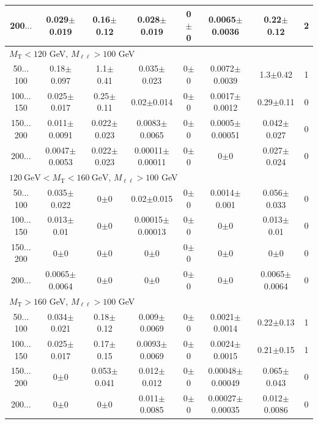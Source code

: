\begin{landscape}
\begin{table}
\begin{center}
\begin{tabular}{| c | c c c c c c c | }
200$\dots$&0.029$\pm$0.019&0.16$\pm$0.12&0.028$\pm$0.019&0$\pm$0&0.0065$\pm$0.0036&0.22$\pm$0.12&2\\
\hline\hline
\multicolumn{8}{l}{$M_{\text{T}} < 120$ GeV, $M_{\ell\ell} > 100$ GeV}\\\hline\hline
50$\dots$100&0.18$\pm$0.097&1.1$\pm$0.41&0.035$\pm$0.023&0$\pm$0&0.0072$\pm$0.0039&1.3$\pm$0.42&1\\
100$\dots$150&0.025$\pm$0.017&0.25$\pm$0.11&0.02$\pm$0.014&0$\pm$0&0.0017$\pm$0.0012&0.29$\pm$0.11&0\\
150$\dots$200&0.011$\pm$0.0091&0.022$\pm$0.023&0.0083$\pm$0.0065&0$\pm$0&0.0005$\pm$0.00051&0.042$\pm$0.027&0\\
200$\dots$&0.0047$\pm$0.0053&0.022$\pm$0.023&0.00011$\pm$0.00011&0$\pm$0&0$\pm$0&0.027$\pm$0.024&0\\
\hline\hline
\multicolumn{8}{l}{$120~\mathrm{GeV} < M_{\text{T}} < 160~\mathrm{GeV}$, $M_{\ell\ell} > 100$ GeV}\\\hline\hline
50$\dots$100&0.035$\pm$0.022&0$\pm$0&0.02$\pm$0.015&0$\pm$0&0.0014$\pm$0.001&0.056$\pm$0.033&0\\
100$\dots$150&0.013$\pm$0.01&0$\pm$0&0.00015$\pm$0.00013&0$\pm$0&0$\pm$0&0.013$\pm$0.01&0\\
150$\dots$200&0$\pm$0&0$\pm$0&0$\pm$0&0$\pm$0&0$\pm$0&0$\pm$0&0\\
200$\dots$&0.0065$\pm$0.0064&0$\pm$0&0$\pm$0&0$\pm$0&0$\pm$0&0.0065$\pm$0.0064&0\\
\hline\hline
\multicolumn{8}{l}{$M_{\text{T}} > 160$ GeV, $M_{\ell\ell} > 100$ GeV}\\\hline\hline
50$\dots$100&0.034$\pm$0.021&0.18$\pm$0.12&0.009$\pm$0.0069&0$\pm$0&0.0021$\pm$0.0014&0.22$\pm$0.13&1\\
100$\dots$150&0.025$\pm$0.017&0.17$\pm$0.15&0.0093$\pm$0.0069&0$\pm$0&0.0024$\pm$0.0015&0.21$\pm$0.15&1\\
150$\dots$200&0$\pm$0&0.053$\pm$0.041&0.012$\pm$0.012&0$\pm$0&0.00048$\pm$0.00049&0.065$\pm$0.043&0\\
200$\dots$&0$\pm$0&0$\pm$0&0.011$\pm$0.0085&0$\pm$0&0.00027$\pm$0.00035&0.012$\pm$0.0086&0\\
\hline\hline
\end{tabular}
\end{center}
\end{table}
\begin{table}

\end{table}
\end{landscape}
